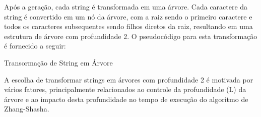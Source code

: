\documentclass[12pt]{article}
\begin{document}
Após a geração, cada string é transformada em uma árvore. Cada caractere da string é convertido em um nó da árvore, com a raiz sendo o primeiro caractere e todos os caracteres subsequentes sendo filhos diretos da raiz, resultando em uma estrutura de árvore com profundidade 2. O pseudocódigo para esta transformação é fornecido a seguir:

\begin{algorithm}[H]
\caption{Transormação de String em Árvore}
\end{algorithm}


A escolha de transformar strings em árvores com profundidade 2 é motivada por vários fatores, principalmente relacionados ao controle da profundidade (L) da árvore e ao impacto desta profundidade no tempo de execução do algoritmo de Zhang-Shasha.
\end{document}

